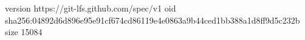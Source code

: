 version https://git-lfs.github.com/spec/v1
oid sha256:04892d6d896e95e91cf674cd86119e4e0863a9b44ced1bb388a1d8ff9d5c232b
size 15084

